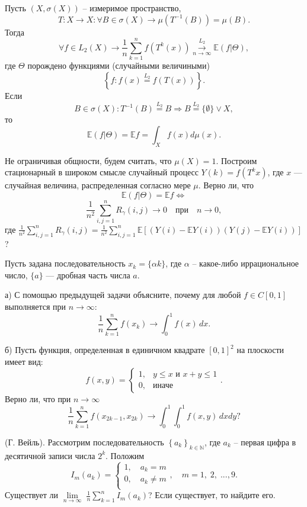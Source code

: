 \begin{problem} Пусть $(X,\sigma(X))$ -- измеримое пространство, $$T:X\to X:\forall B\in \sigma(X)\to \mu(T^{-1}(B)) = \mu(B).$$ Тогда $$\forall f\in L_2(X)\to\frac{1}{n}\sum_{k=1}^n f(T^k(x))\overset{L_2}{\underset{n\to\infty}{\longrightarrow}} \mathbb{E}(f|\Theta),$$ где $\Theta$ порождено функциями (случайными величиными) $$\left\{f:f(x)\overset{L_2}{=}f(T(x))\right\}.$$
Если $$B\in\sigma(X): T^{-1}(B)\overset{L_2}{=}B\Rightarrow B\overset{L_2}{=}\{\emptyset\}\lor X,$$ то $$\mathbb{E}(f|\Theta) = \mathbb{E} f=\int_{X}f(x)d\mu(x).$$

Не ограничивая общности, будем считать, что $\mu(X)=1$. Построим стационарный в широком смысле случайный процесс $Y(k)=f(T^kx)$, где $x$ --- случайная величина, распределенная согласно мере $\mu$. Верно ли, что 
$$\mathbb{E}(f|\Theta) =\mathbb{E}f\Leftrightarrow$$
$$ \frac{1}{n^2}\sum_{i,j=1}^{n}R_{\gamma}(i,j) {\longrightarrow}0\quad \text{при}\quad n\to 0,$$
где 
$\frac{1}{n^2}\sum_{i,j=1}^{n}R_{\gamma}(i,j) = \frac{1}{n^2}\sum_{i,j=1}^{n} \mathbb{E}[({Y}(i)-\mathbb{E}{Y}(i))({Y}(j)-\mathbb{E}{Y}(i))]$?
\end{problem}

\begin{problem}
Пусть задана последовательность  $x_k = \{\alpha k\}$, где  $\alpha$ -- какое-либо иррациональное число, $\{a\}$ --- дробная часть числа $a$. 

а) С помощью предыдущей задачи объясните, почему для любой $f\in C[0,1]$ выполняется при ${n\to\infty}$:
$$
\frac{1}{n}\sum_{k=1}^n f(x_k){\longrightarrow}\int_{0}^1 f(x)\,dx.
$$

б) Пусть функция, определенная в единичном квадрате $[0,1]^2$ на плоскости имеет вид:
$$
f(x,y) = \begin{cases}
 1, & y\leq x \text{ и } x+y\leq 1\\
 0, & \textit{иначе} 
\end{cases}.
$$
Верно ли, что при ${n\to\infty}$
$$
\frac{1}{n}\sum_{k=1}^n f(x_{2k-1},x_{2k}){\longrightarrow}\int_0^1\int_0^1 f(x,y)\,dxdy ?
$$

\end{problem}


\begin{problem} (Г. Вейль). Рассмотрим последовательность 
$\left\{ {a_k } \right\}_{k\in {\mathbb{N}}} $, где $a_k $ -- первая цифра в 
десятичной записи числа $2^k$. Положим $$I_m \left( {a_k } \right)=\left\{ 
{\begin{array}{l}
 1,\quad a_k =m \\ 
 0,\quad a_k \ne m \\ 
 \end{array}} \right.,\quad m=1,\;2,\;...,9.$$ Существует ли $\mathop {\lim 
}\limits_{n\to \infty } \;\frac{1}{n}\sum\limits_{k=1}^n {I_m \left( {a_k } 
\right)}$? Если существует, то найдите его.
\end{problem}

